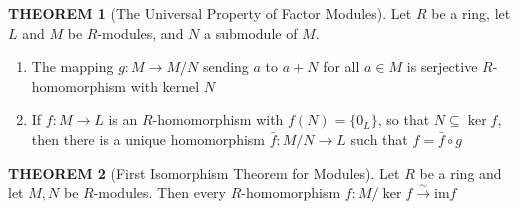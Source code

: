 \documentclass[12pt]{article}
\theoremstyle{definition}
\newtheorem{theorem}{THEOREM}[subsection]
\newcommand{\image}{\text{im}}
\begin{document}
\begin{theorem}[The Universal Property of Factor Modules]
    Let $R$ be a ring, let $L$ and $M$ be $R$-modules, and $N$ a submodule of $M$.
    \begin{enumerate}
        \item The mapping $g: M \rightarrow M/N$ sending $a$ to $a+N$ for all $a \in M$ is serjective $R$-homomorphism with kernel $N$
        \item If $f:M \rightarrow L$ is an $R$-homomorphism with $f(N) = \{0_L\}$, so that $N \subseteq \ker f$, then there is a unique homomorphism $\bar{f}:M/N \rightarrow L$ such that $f = \bar{f}\circ g$
    \end{enumerate}
\end{theorem}

\begin{theorem}[First Isomorphism Theorem for Modules]
    Let $R$ be a ring and let $M,N$ be $R$-modules. Then every $R$-homomorphism $f:M/\ker f \stackrel{\sim}{\rightarrow} \image f$
\end{theorem}
\end{document}
